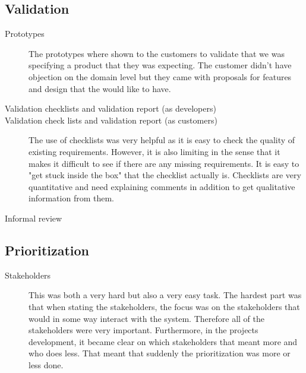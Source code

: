 \documentclass[10pt,a4paper]{article}
\begin{document}
\subsection{Validation}
\begin{description}
\item[Prototypes] The prototypes where shown to the customers to validate that we was specifying a product that they was expecting. The customer didn’t have objection on the domain level but they came with proposals for features and design that the would like to have.

\item[Validation checklists and validation report (as developers)]


\item[Validation check lists and validation report (as customers)] The use of checklists was very helpful as it is easy to check the quality of existing requirements. However, it is also limiting in the sense that it makes it difficult to see if there are any missing requirements. It is easy to "get stuck inside the box" that the checklist actually is. Checklists are very quantitative and need explaining comments in addition to get qualitative information from them.

\item[Informal review]
\end{description}

\subsection{Prioritization}
\begin{description}
\item[Stakeholders] This was both a very hard but also a very easy task. The hardest part was that when stating the stakeholders, the focus was on the stakeholders that would in some way interact with the system. Therefore all of the stakeholders were very important. Furthermore, in the projects development, it became clear on which stakeholders that meant more and who does less. That meant that suddenly the prioritization was more or less done.
\end{description}

\end{document}
